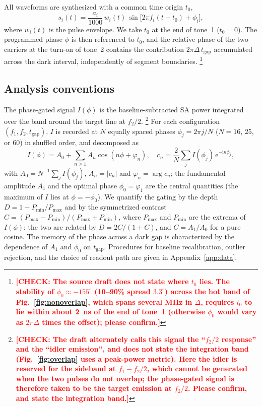 \documentclass[aps,prb,reprint,superscriptaddress,floatfix]{revtex4-2}
\newcommand{\chk}[1]{\textcolor{red}{\textbf{[CHECK: #1]}}}
\newcommand{\chk}[1]{}
\newcommand{\ii}{\mathrm{i}}
\newcommand{\ee}{\mathrm{e}}
\newcommand{\tgap}{t_{\mathrm{gap}}}
\begin{document}
All waveforms are synthesized with a common time origin $t_0$,
\begin{equation}
s_i(t)=\frac{a_i}{1000}\,w_i(t)\,\sin\!\big[2\pi f_i(t-t_0)+\phi_i\big],
\label{eq:waveform}
\end{equation}
where $w_i(t)$ is the pulse envelope. We take $t_0$ at the end of tone~1 ($t_0=0$). The programmed phase $\phi$ is then referenced to $t_0$, and the relative phase of the two carriers at the turn-on of tone~2 contains the contribution $2\pi\Delta\,\tgap$ accumulated across the dark interval, independently of segment boundaries.%
\footnote{\chk{The source draft does not state where $t_0$ lies. The stability of $\phi_0\approx-155^\circ$ (10--90\% spread $3.3^\circ$) across the hot band of Fig.~\ref{fig:nonoverlap}, which spans several MHz in $\Delta$, requires $t_0$ to lie within about \SI{2}{\nano\second} of the end of tone~1 (otherwise $\phi_0$ would vary as $2\pi\Delta$ times the offset); please confirm.}}

\subsection{Analysis conventions}\label{sec:analysis}

The phase-gated signal $I(\phi)$ is the baseline-subtracted SA power integrated over the band around the target line at $f_2/2$.%
\footnote{\chk{The draft alternately calls this signal the ``$f_2/2$ response'' and the ``idler emission'', and does not state the integration band (Fig.~\ref{fig:overlap} uses a peak-power metric). Here the idler is reserved for the sideband at $f_1-f_2/2$, which cannot be generated when the two pulses do not overlap; the phase-gated signal is therefore taken to be the target emission at $f_2/2$. Please confirm, and state the integration band.}}
For each configuration $(f_1,f_2,\tgap)$, $I$ is recorded at $N$ equally spaced phases $\phi_j=2\pi j/N$ ($N=16$, 25, or 60) in shuffled order, and decomposed as
\begin{equation}
I(\phi)=A_0+\sum_{n\ge1}A_n\cos(n\phi+\varphi_n),\quad c_n=\frac{2}{N}\sum_{j}I(\phi_j)\,\ee^{-\ii n\phi_j},
\label{eq:dft}
\end{equation}
with $A_0=N^{-1}\sum_j I(\phi_j)$, $A_n=|c_n|$ and $\varphi_n=\arg c_n$; the fundamental amplitude $A_1$ and the optimal phase $\phi_0=\varphi_1$ are the central quantities (the maximum of $I$ lies at $\phi=-\phi_0$). We quantify the gating by the depth $D=1-P_{\min}/P_{\max}$ and by the symmetrized contrast $C=(P_{\max}-P_{\min})/(P_{\max}+P_{\min})$, where $P_{\max}$ and $P_{\min}$ are the extrema of $I(\phi)$; the two are related by $D=2C/(1+C)$, and $C=A_1/A_0$ for a pure cosine. The memory of the phase across a dark gap is characterized by the dependence of $A_1$ and $\phi_0$ on $\tgap$. Procedures for baseline recalibration, outlier rejection, and the choice of readout path are given in Appendix~\ref{app:data}.
\end{document}
